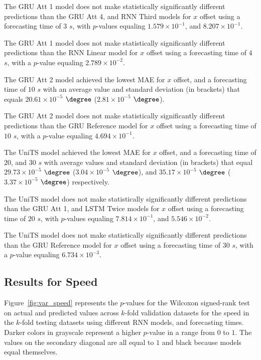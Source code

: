 The GRU Att 1 model does not make statistically significantly different predictions than the GRU Att 4, and RNN Third models for $x$ offset using a forecasting time of $3$ $s$, with $p$-values equaling $1.579 \times 10^{-1}$, and $8.207 \times 10^{-1}$.

The GRU Att 1 model does not make statistically significantly different predictions than the RNN Linear model for $x$ offset using a forecasting time of $4$ $s$, with a $p$-value equaling $2.789 \times 10^{-2}$.

The GRU Att 2 model achieved the lowest MAE for $x$ offset, and a forecasting time of $10$ $s$ with an average value and standard deviation (in brackets) that equals $20.61 \times 10^{-5}$ $\degree$ ($2.81 \times 10^{-5}$ $\degree$).

The GRU Att 2 model does not make statistically significantly different predictions than the GRU Reference model for $x$ offset using a forecasting time of $10$ $s$, with a $p$-value equaling $4.694 \times 10^{-1}$.

The UniTS model achieved the lowest MAE for $x$ offset, and a forecasting time of $20$, and $30$ $s$ with average values and standard deviation (in brackets) that equal $29.73 \times 10^{-5}$ $\degree$ ($3.04 \times 10^{-5}$ $\degree$), and $35.17 \times 10^{-5}$ $\degree$ ($3.37 \times 10^{-5}$ $\degree$) respectively.

The UniTS model does not make statistically significantly different predictions than the GRU Att 1, and LSTM Twice models for $x$ offset using a forecasting time of $20$ $s$, with $p$-values equaling $7.814 \times 10^{-1}$, and $5.546 \times 10^{-2}$.

The UniTS model does not make statistically significantly different predictions than the GRU Reference model for $x$ offset using a forecasting time of $30$ $s$, with a $p$-value equaling $6.734 \times 10^{-3}$.

\subsection{Results for Speed}

Figure~\ref{fig:var_speed} represents the $p$-values for the Wilcoxon signed-rank test on actual and predicted values across $k$-fold validation datasets for the speed in the $k$-fold testing datasets using different RNN models, and forecasting times. Darker colors in grayscale represent a higher $p$-value in a range from $0$ to $1$. The values on the secondary diagonal are all equal to $1$ and black because models equal themselves.

